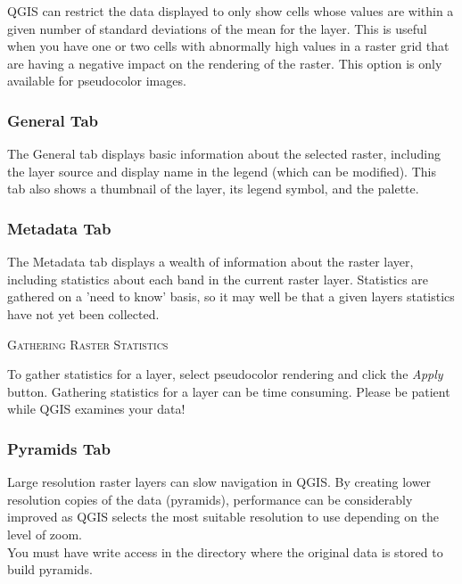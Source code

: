\documentclass[10pt,english]{article}
\newcommand\qgistip[1]{\raggedright\small{#1}}
\begin{document}
\begin{onehalfspace}
QGIS can restrict the data displayed to only show cells whose values are within
a given number of standard deviations of the mean for the
layer. This is useful when you have one or two cells with abnormally high values in a raster grid that are having a negative impact on the rendering of the raster. This option is only available for pseudocolor images.\\

\subsubsection{General Tab}
The General tab displays basic information about the selected raster, including
the layer source and  display name in the legend (which can be modified). This
tab also shows a thumbnail of the layer, its legend symbol, and the
palette.

\subsubsection{Metadata Tab}
The Metadata tab displays a wealth of information about the raster layer,
including statistics about each band in the current raster layer. Statistics are
gathered on a 'need to know' basis, so it may well be that a given layers
statistics have not yet been collected.


\begin{Tip}\caption{\textsc{Gathering Raster Statistics}}
\qgistip{To gather statistics for a layer, select pseudocolor rendering and
click the \textsl{Apply} button. Gathering statistics for a layer can be time
consuming. Please be patient while QGIS examines your
data!\index{rasters!statistics}
}
\end{Tip}
\subsubsection{Pyramids Tab}
Large resolution raster layers can slow navigation in QGIS. By creating lower
resolution copies of the data (pyramids), performance can be considerably
improved as QGIS selects the most suitable resolution to use depending on the
level of zoom. \\

You must have write access in the directory where the original data is stored to build pyramids. \\


\end{onehalfspace}
\end{document}
